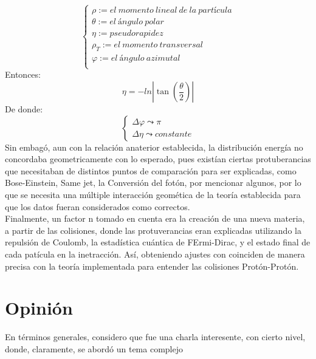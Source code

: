 \documentclass[letterpaper, 11pt]{article}
\begin{document}
\begin{multicols}{2}
\begin{equation}
\begin{cases}
    \rho := el\ momento\ lineal\ de\ la\ partícula \\
    \theta := el\ ángulo\ polar \\
    \eta := pseudorapidez \\
    \rho_{T} := el\ momento\ transversal\ \\
    \varphi := el\ ángulo\ azimutal \\
\end{cases}
\end{equation}
Entonces:
\begin{equation}
    \eta= - ln |\tan(\dfrac{\theta}{2})|    
\end{equation}
De donde:
\begin{equation}
\begin{cases}
    \Delta\varphi  \leadsto \pi \\
    \Delta\eta \leadsto constante 
\end{cases}
\end{equation}
Sin embagó, aun con la relación anaterior establecida, la distribución energía no concordaba geometricamente con lo esperado, pues existían ciertas protuberancias que necesitaban de distintos puntos de comparación para ser explicadas, como Bose-Einstein, Same jet, la Conversión del fotón, por mencionar algunos, por lo que se necesita una múltiple interacción geomética de la teoría establecida para que los datos fueran considerados como correctos.\\
 Finalmente, un factor n tomado en cuenta era la creación de una nueva materia, a partir de las colisiones, donde las protuverancias eran explicadas utilizando la repulsión de Coulomb, la estadística cuántica de FErmi-Dirac, y el estado final de cada patícula en la inetracción. Así, obteniendo ajustes con coinciden de manera precisa con la teoría implementada para entender las colisiones Protón-Protón.
 
 
\end{multicols}
\section{Opinión}
\begin{multicols}{2}

En términos generales, considero que fue una charla interesente, con cierto nivel, donde, claramente, se abordó un tema complejo  

\end{multicols}
\end{document}
